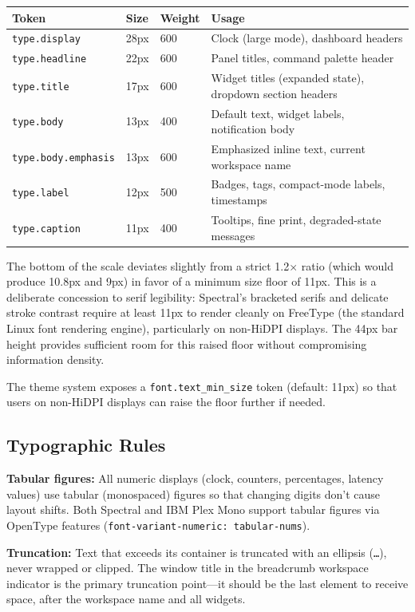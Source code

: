 \documentclass[11pt,a4paper]{article}
\begin{document}
\begin{longtable}{p{3cm} p{2cm} p{2cm} p{6.5cm}}
\toprule
\textbf{Token} & \textbf{Size} & \textbf{Weight} & \textbf{Usage} \\
\midrule
\texttt{type.display} & 28px & 600 & Clock (large mode), dashboard headers \\
\texttt{type.headline} & 22px & 600 & Panel titles, command palette header \\
\texttt{type.title} & 17px & 600 & Widget titles (expanded state), dropdown section headers \\
\texttt{type.body} & 13px & 400 & Default text, widget labels, notification body \\
\texttt{type.body.emphasis} & 13px & 600 & Emphasized inline text, current workspace name \\
\texttt{type.label} & 12px & 500 & Badges, tags, compact-mode labels, timestamps \\
\texttt{type.caption} & 11px & 400 & Tooltips, fine print, degraded-state messages \\
\bottomrule
\end{longtable}

The bottom of the scale deviates slightly from a strict 1.2$\times$ ratio (which would produce 10.8px and 9px) in favor of a minimum size floor of 11px. This is a deliberate concession to serif legibility: Spectral's bracketed serifs and delicate stroke contrast require at least 11px to render cleanly on FreeType (the standard Linux font rendering engine), particularly on non-HiDPI displays. The 44px bar height provides sufficient room for this raised floor without compromising information density.

The theme system exposes a \texttt{font.text\_min\_size} token (default: 11px) so that users on non-HiDPI displays can raise the floor further if needed.

\subsection{Typographic Rules}

\textbf{Tabular figures:} All numeric displays (clock, counters, percentages, latency values) use tabular (monospaced) figures so that changing digits don't cause layout shifts. Both Spectral and IBM Plex Mono support tabular figures via OpenType features (\texttt{font-variant-numeric: tabular-nums}).

\textbf{Truncation:} Text that exceeds its container is truncated with an ellipsis (\texttt{\ldots}), never wrapped or clipped. The window title in the breadcrumb workspace indicator is the primary truncation point---it should be the last element to receive space, after the workspace name and all widgets.
\end{document}
